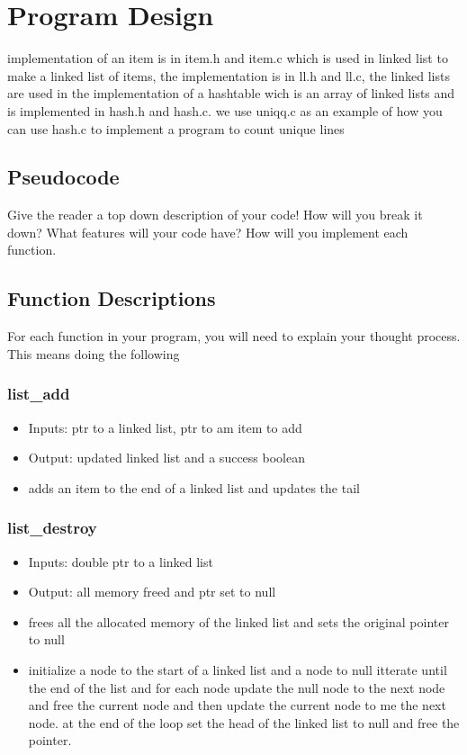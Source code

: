 \documentclass{article}
\begin{document}
\section*{Program Design}

implementation of an item is in item.h and item.c which is used in  linked list to make a linked list of items, the implementation is in ll.h and ll.c, the linked lists are used in the implementation of a hashtable wich is an array of linked lists and is implemented in hash.h and hash.c. we use uniqq.c as an example of how you can use hash.c to implement a program to count unique lines

\subsection*{Pseudocode}
Give the reader a top down description of your code! How will you break it down? What features will your code have? 
How will you implement each function. 

\subsection*{Function Descriptions}
For each function in your program, you will need to explain your thought process. This means doing the following
\subsubsection{list_add}
\begin{itemize}
    \item Inputs: ptr to a linked list, ptr to am item to add
    \item Output: updated linked list and a success boolean
    \item adds an item to the end of a linked list and updates the tail 
\end{itemize}
\subsubsection{list_destroy}
\begin{itemize}
    \item Inputs: double ptr to a linked list
    \item Output: all memory freed and ptr set to null
    \item frees all the allocated memory of the linked list and sets the original pointer to null
    \item initialize a node to the start of a linked list and a node to null itterate until the end of the list and for each node update the null node to the next node and free the current node and then update the current node to me the next node. at the end of the loop set the head of the linked list to null and free the pointer.
\end{itemize}
\end{document}

